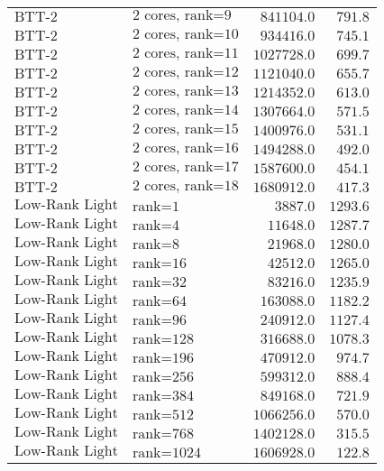 \begin{longtable}{llrr}
$\text{BTT-2}$ & $\text{2 cores, rank=9}$ & $841104.0$ & $791.8$\\
$\text{BTT-2}$ & $\text{2 cores, rank=10}$ & $934416.0$ & $745.1$\\
$\text{BTT-2}$ & $\text{2 cores, rank=11}$ & $1027728.0$ & $699.7$\\
$\text{BTT-2}$ & $\text{2 cores, rank=12}$ & $1121040.0$ & $655.7$\\
$\text{BTT-2}$ & $\text{2 cores, rank=13}$ & $1214352.0$ & $613.0$\\
$\text{BTT-2}$ & $\text{2 cores, rank=14}$ & $1307664.0$ & $571.5$\\
$\text{BTT-2}$ & $\text{2 cores, rank=15}$ & $1400976.0$ & $531.1$\\
$\text{BTT-2}$ & $\text{2 cores, rank=16}$ & $1494288.0$ & $492.0$\\
$\text{BTT-2}$ & $\text{2 cores, rank=17}$ & $1587600.0$ & $454.1$\\
$\text{BTT-2}$ & $\text{2 cores, rank=18}$ & $1680912.0$ & $417.3$\\
$\text{Low-Rank Light}$ & $\text{rank=1}$ & $3887.0$ & $1293.6$\\
$\text{Low-Rank Light}$ & $\text{rank=4}$ & $11648.0$ & $1287.7$\\
$\text{Low-Rank Light}$ & $\text{rank=8}$ & $21968.0$ & $1280.0$\\
$\text{Low-Rank Light}$ & $\text{rank=16}$ & $42512.0$ & $1265.0$\\
$\text{Low-Rank Light}$ & $\text{rank=32}$ & $83216.0$ & $1235.9$\\
$\text{Low-Rank Light}$ & $\text{rank=64}$ & $163088.0$ & $1182.2$\\
$\text{Low-Rank Light}$ & $\text{rank=96}$ & $240912.0$ & $1127.4$\\
$\text{Low-Rank Light}$ & $\text{rank=128}$ & $316688.0$ & $1078.3$\\
$\text{Low-Rank Light}$ & $\text{rank=196}$ & $470912.0$ & $974.7$\\
$\text{Low-Rank Light}$ & $\text{rank=256}$ & $599312.0$ & $888.4$\\
$\text{Low-Rank Light}$ & $\text{rank=384}$ & $849168.0$ & $721.9$\\
$\text{Low-Rank Light}$ & $\text{rank=512}$ & $1066256.0$ & $570.0$\\
$\text{Low-Rank Light}$ & $\text{rank=768}$ & $1402128.0$ & $315.5$\\
$\text{Low-Rank Light}$ & $\text{rank=1024}$ & $1606928.0$ & $122.8$\\

\end{longtable}
